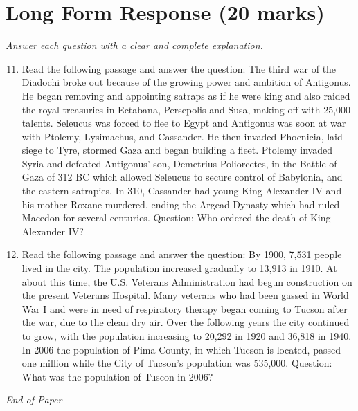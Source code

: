 \documentclass[12pt]{article}
\begin{document}
\section*{Long Form Response (20 marks)}
\textit{Answer each question with a clear and complete explanation.}
\begin{enumerate}[label=\arabic*.]
\setcounter{enumi}{10}
\item Read the following passage and answer the question: The third war of the Diadochi broke out because of the growing power and ambition of Antigonus. He began removing and appointing satraps as if he were king and also raided the royal treasuries in Ectabana, Persepolis and Susa, making off with 25,000 talents. Seleucus was forced to flee to Egypt and Antigonus was soon at war with Ptolemy, Lysimachus, and Cassander. He then invaded Phoenicia, laid siege to Tyre, stormed Gaza and began building a fleet. Ptolemy invaded Syria and defeated Antigonus' son, Demetrius Poliorcetes, in the Battle of Gaza of 312 BC which allowed Seleucus to secure control of Babylonia, and the eastern satrapies. In 310, Cassander had young King Alexander IV and his mother Roxane murdered, ending the Argead Dynasty which had ruled Macedon for several centuries. Question: Who ordered the death of King Alexander IV?
\item Read the following passage and answer the question: By 1900, 7,531 people lived in the city. The population increased gradually to 13,913 in 1910. At about this time, the U.S. Veterans Administration had begun construction on the present Veterans Hospital. Many veterans who had been gassed in World War I and were in need of respiratory therapy began coming to Tucson after the war, due to the clean dry air. Over the following years the city continued to grow, with the population increasing to 20,292 in 1920 and 36,818 in 1940. In 2006 the population of Pima County, in which Tucson is located, passed one million while the City of Tucson's population was 535,000. Question: What was the population of Tuscon in 2006?
\end{enumerate}

\vfill
\noindent\textit{End of Paper}
\end{document}
